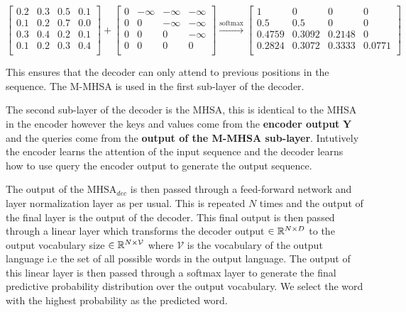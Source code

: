 \documentclass[main.tex]{subfiles}
\begin{document}
\begin{equation}
	\begin{bmatrix}
		0.2 & 0.3 & 0.5 & 0.1 \\
		0.1 & 0.2 & 0.7 & 0.0 \\
		0.3 & 0.4 & 0.2 & 0.1 \\
		0.1 & 0.2 & 0.3 & 0.4 \\
	\end{bmatrix} + 
	\begin{bmatrix}
		0 & -\infty & -\infty & -\infty \\
		0 & 0 & -\infty & -\infty \\
		0 & 0 & 0 & -\infty \\
		0 & 0 & 0 & 0 \\
	\end{bmatrix}
	\xrightarrow{\text{softmax}}
	\begin{bmatrix}
		1 & 0 & 0 & 0 \\
		0.5 & 0.5 & 0 & 0 \\
		0.4759 & 0.3092 & 0.2148 & 0 \\
		0.2824 & 0.3072 & 0.3333 & 0.0771 \\
	\end{bmatrix}
\end{equation}



This ensures that the decoder can only attend to previous positions in the sequence. The M-MHSA is used in the first sub-layer of the decoder. 

The second sub-layer of the decoder is the MHSA, this is identical to the MHSA in the encoder however the keys and values come from the \textbf{encoder output} $\bm{Y}$ and the queries come from the \textbf{output of the M-MHSA sub-layer}. Intutively the encoder learns the attention of the input sequence and the decoder learns how to use query the encoder output to generate the output sequence.

The output of the $\text{MHSA}_{dec}$ is then passed through a feed-forward network and layer normalization layer as per usual. This is repeated $N$ times and the output of the final layer is the output of the decoder. This final output is then passed through a linear layer which transforms the decoder output $\in \mathbb{R}^{N \times D}$ to the output vocabulary size $\in \mathbb{R}^{N \times \mathcal{V}}$ where $\mathcal{V}$ is the vocabulary of the output language i.e the set of all possible words in the output language. The output of this linear layer is then passed through a softmax layer to generate the final predictive probability distribution over the output vocabulary. We select the word with the highest probability as the predicted word.
\end{document}
